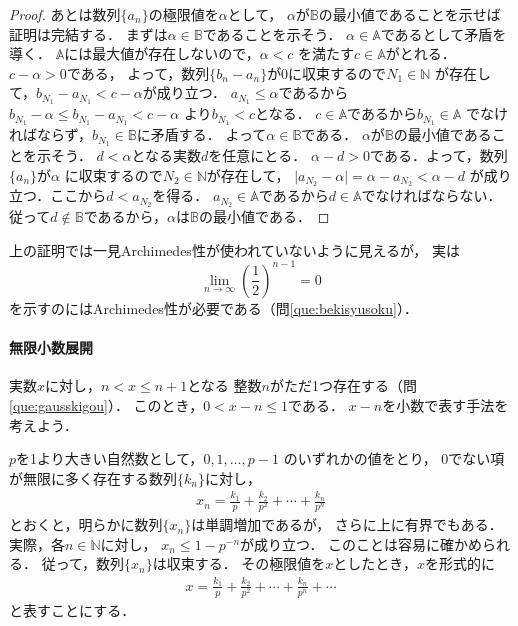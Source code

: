 \begin{proof}
       あとは数列$\{ a_n \}$の極限値を$\alpha$として，
       $\alpha$が$\mathbb{B}$の最小値であることを示せば証明は完結する．
       まずは$\alpha \in \mathbb{B}$であることを示そう．
       $\alpha \in \mathbb{A}$であるとして矛盾を導く．
       $\mathbb{A}$には最大値が存在しないので，$\alpha < c$
       を満たす$c \in \mathbb{A}$がとれる．
       $c- \alpha >0$である，
       よって，数列$\{ b_n - a_n \}$が0に収束するので$N_1 \in \mathbb{N}$
       が存在して，$b_{N_1} - a_{N_1} < c - \alpha$が成り立つ．
       $a_{N_1} \leq \alpha$であるから
       $b_{N_1} - \alpha \leq b_{N_1} - a_{N_1} < c - \alpha $
       より$b_{N_1} <c$となる．
       $c \in \mathbb{A}$であるから$b_{N_1} \in \mathbb{A}$
       でなければならず，$b_{N_1} \in \mathbb{B}$に矛盾する．
       よって$\alpha \in \mathbb{B}$である．
       $\alpha$が$\mathbb{B}$の最小値であることを示そう．
       $d < \alpha $となる実数$d$を任意にとる．
       $\alpha - d >0$である．よって，数列$\{ a_n \}$が$\alpha$
       に収束するので$N_2 \in \mathbb{N}$が存在して，
       $\lvert a_{N_2} - \alpha \rvert = \alpha - a_{N_2} < \alpha - d$
       が成り立つ．ここから$d < a_{N_2}$を得る．
       $a_{N_2} \in \mathbb{A}$であるから$d \in \mathbb{A}$でなければならない．
       従って$d \notin \mathbb{B}$であるから，$\alpha$は$\mathbb{B}$の最小値である．
     \end{proof}
     上の証明では一見Archimedes性が使われていないように見えるが，
     実は
     \[
       \lim_{n \to \infty} \left( \frac{1}{2} \right ) ^{n-1} =0
     \]
     を示すのにはArchimedes性が必要である（問\ref{que:bekisyusoku}）．
    
    \paragraph{無限小数展開} 
     実数$x$に対し，$n < x \leq n+1$となる
     整数$n$がただ1つ存在する（問\ref{que:gausskigou}）．
     このとき，$0 < x -n \leq 1$である．
     $x-n$を小数で表す手法を考えよう．

     $p$を1より大きい自然数として，$0,  1,  \ldots , p-1$
     のいずれかの値をとり，
     0でない項が無限に多く存在する数列$\{ k_n \}$に対し，
     \begin{align*}
       x_n = \frac{k_1}{p} + \frac{k_2}{p^2} + \cdots + \frac{k_n}{p^n}
     \end{align*}
     とおくと，明らかに数列$\{ x_n \}$は単調増加であるが，
     さらに上に有界でもある．
     実際，各$n \in \mathbb{N}$に対し，
     $x_n \leq 1 - p^{-n}$が成り立つ．
     このことは容易に確かめられる．
     従って，数列$\{ x_n \}$は収束する．
     その極限値を$x$としたとき，$x$を形式的に
     \begin{align}
       x= \frac{k_1}{p} + \frac{k_2}{p^2} + \cdots + \frac{k_n}{p^n} + \cdots 
       \label{eq:psinmugen}
     \end{align}
     と表すことにする．

